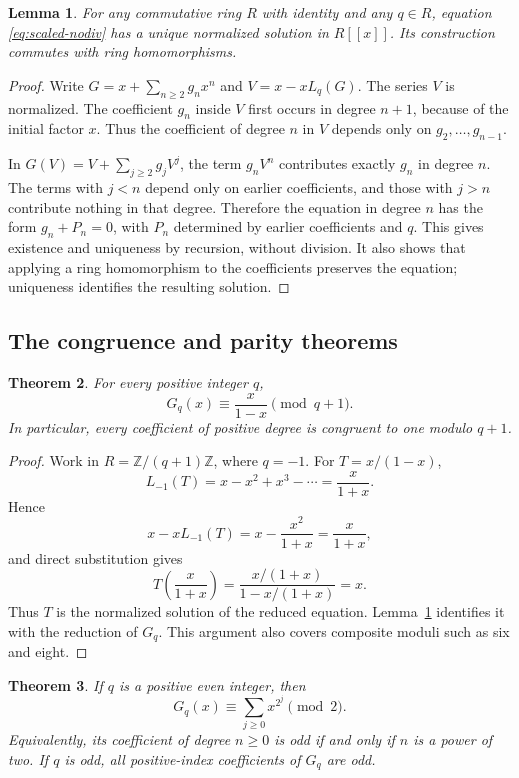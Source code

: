 \documentclass[11pt,a4paper]{article}
\newtheorem{theorem}{Theorem}[section]
\newtheorem{lemma}[theorem]{Lemma}
\theoremstyle{remark}
\newcommand{\Z}{\mathbb Z}
\begin{document}
\begin{lemma}\label{lem:scaled-unique}
For any commutative ring $R$ with identity and any $q\in R$, equation
\eqref{eq:scaled-nodiv} has a unique normalized solution in $R[[x]]$.
Its construction commutes with ring homomorphisms.
\end{lemma}

\begin{proof}
Write $G=x+\sum_{n\ge2}g_nx^n$ and
$V=x-xL_q(G)$. The series $V$ is normalized. The coefficient $g_n$
inside $V$ first occurs in degree $n+1$, because of the initial
factor $x$. Thus the coefficient of degree $n$ in $V$ depends
only on $g_2,\ldots,g_{n-1}$.

In $G(V)=V+\sum_{j\ge2}g_jV^j$, the term $g_nV^n$ contributes
exactly $g_n$ in degree $n$. The terms with $j<n$ depend only on
earlier coefficients, and those with $j>n$ contribute nothing in
that degree. Therefore the equation in degree $n$ has the form
$g_n+P_n=0$, with $P_n$ determined by earlier coefficients and $q$.
This gives existence and uniqueness by recursion, without division.
It also shows that applying a ring homomorphism to the coefficients
preserves the equation; uniqueness identifies the resulting solution.
\end{proof}

\subsection{The congruence and parity theorems}

\begin{theorem}\label{thm:scaled-congruence}
For every positive integer $q$,
\[
G_q(x)\equiv\frac{x}{1-x}\pmod{q+1}.
\]
In particular, every coefficient of positive degree is congruent to
one modulo $q+1$.
\end{theorem}

\begin{proof}
Work in $R=\Z/(q+1)\Z$, where $q=-1$. For $T=x/(1-x)$,
\[
L_{-1}(T)=x-x^2+x^3-\cdots=\frac{x}{1+x}.
\]
Hence
\[
x-xL_{-1}(T)=x-\frac{x^2}{1+x}=\frac{x}{1+x},
\]
and direct substitution gives
\[
T\left(\frac{x}{1+x}\right)
=\frac{x/(1+x)}{1-x/(1+x)}=x.
\]
Thus $T$ is the normalized solution of the reduced equation.
Lemma~\ref{lem:scaled-unique} identifies it with the reduction of
$G_q$. This argument also covers composite moduli such as six
and eight.
\end{proof}

\begin{theorem}\label{thm:scaled-parity}
If $q$ is a positive even integer, then
\[
G_q(x)\equiv\sum_{j\ge0}x^{2^j}\pmod2.
\]
Equivalently, its coefficient of degree $n\ge0$ is odd if and only
if $n$ is a power of two. If $q$ is odd, all positive-index
coefficients of $G_q$ are odd.
\end{theorem}
\end{document}
